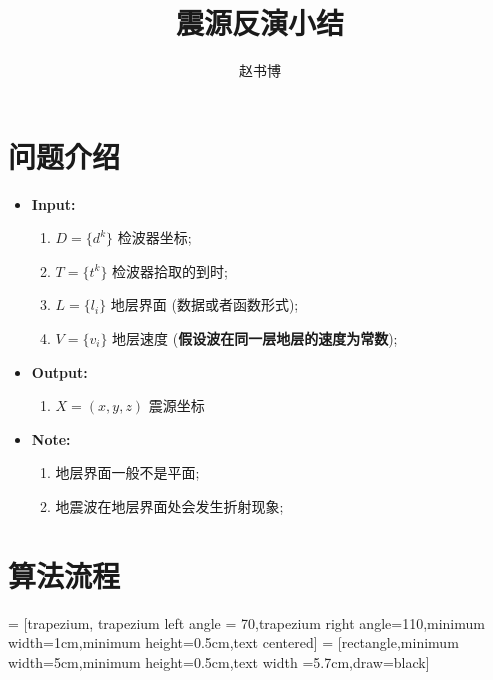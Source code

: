 \documentclass{article}
\begin{document}
\newtheorem{theorem}{Theorem}[section]
\newtheorem{lemma}{Lemma}[section]
\newtheorem{corollary}{Corollary}[section]
\newtheorem{prop}{Proposition}[section]
\newtheorem{remark}{Remark}[section]
\newtheorem{definition}{Definition}[section]
\newtheorem{exercise}{Exercise}[section]
\renewcommand{\baselinestretch}{1.1}

\begin{CJK*}{UTF8}{gkai}
  \title{震源反演小结 }
  \author{赵书博}
  \maketitle

  \section{问题介绍}

  \begin{itemize}
  \item \textbf{Input:}
    \begin{enumerate}
    \item $D=\{d^k\}$ 检波器坐标;
    \item $T=\{t^k\}$ 检波器拾取的到时;
    \item $L=\{l_i\}$ 地层界面 (数据或者函数形式);
    \item  $V=\{v_i\}$ 地层速度 (\textbf{假设波在同一层地层的速度为常数});
    \end{enumerate}

  \item \textbf{Output:}
    \begin{enumerate}
    \item  $X=(x,y,z)$ 震源坐标
    \end{enumerate}
  \item \textbf{Note:}
    \begin{enumerate}
    \item 地层界面一般不是平面;
    \item 地震波在地层界面处会发生折射现象;

    \end{enumerate}
  \end{itemize}

  \section{算法流程}

   = [trapezium, trapezium left angle = 70,trapezium right angle=110,minimum width=1cm,minimum height=0.5cm,text centered]
   = [rectangle,minimum width=5cm,minimum height=0.5cm,text width =5.7cm,draw=black]


\end{CJK*}
\end{document}
